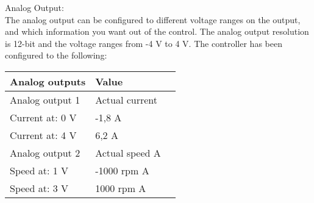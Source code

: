 Analog Output:\\
The analog output can be configured to different voltage ranges on the output, and which information you want out of the control.
The analog output resolution is 12-bit and the voltage ranges from -4 V to 4 V. The controller has been configured to the following:
\begin{table}[H]
	\begin{tabular}{|l|l|p{4.3cm}|}
		\hline%
		\textbf{Analog outputs}       &  \textbf{Value}         \\
		\hline%
		Analog output 1                                & Actual current           \\
		\hline%
		Current at: 0 V							  & -1,8 A              \\
		\hline%
		Current at: 4 V							  & 6,2 A              \\
		\hline%
		Analog output 2							  & Actual speed A              \\
		\hline%
		Speed at: 1 V							  & -1000 rpm A              \\
		\hline%
		Speed at: 3 V							  & 1000 rpm A              \\
		\hline%
	\end{tabular}
\end{table}

